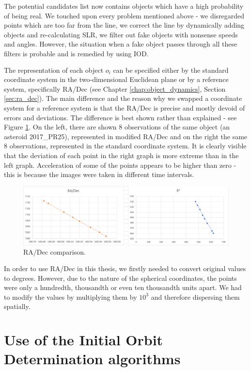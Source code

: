 	The potential candidates list now contains objects which have a high probability of being real. We touched upon every problem mentioned above - we disregarded points which are too far from the line, we correct the line by dynamically adding objects and re-calculating SLR, we filter out fake objects with nonsense speeds and angles. However, the situation when a fake object passes through all these filters is probable and is remedied by using IOD.
	
	The representation of each object $o_i$ can be specified either by the standard coordinate system in the two-dimensional Euclidean plane or by a reference system, specifically RA/Dec (see Chapter \ref{chap:object_dynamics}, Section \ref{sec:ra_dec}). The main difference and the reason why we swapped  a coordinate system for a reference system is that the RA/Dec is precise and mostly devoid of errors and deviations. The difference is best shown rather than explained - see Figure \ref{fig:regresia3}. On the left, there are shown 8 observations of the same object (an asteroid 2017\_PR25), represented in modified RA/Dec and on the right the same 8 observations, represented in the standard coordinate system. It is clearly visible that the deviation of each point in the right graph is more extreme than in the left graph. Acceleration of some of the points appears to be higher than zero - this is because the images were taken in different time intervals.
	
	\begin{figure}[H]
	\centering
	  \includegraphics[width=12cm]{images/regresia3}
		  \caption{RA/Dec comparison.}
	  \label{fig:regresia3}
	\end{figure}
	
	In order to use RA/Dec in this thesis, we firstly needed to convert original values to degrees. However, due to the nature of the spherical coordinates, the points were only a hundredth, thousandth or even ten thousandth units apart. We had to modify the values by multiplying them by $10^3$ and therefore dispersing them spatially.

\section{Use of the Initial Orbit Determination algorithms}\label{sec:IDO}

